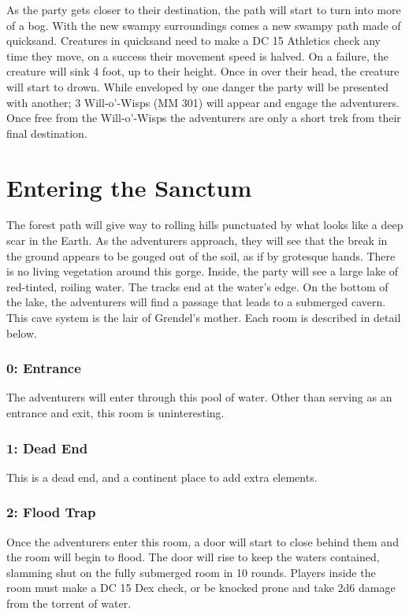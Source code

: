 \documentclass[10pt,twoside,twocolumn,openany]{book}
\begin{document}
As the party gets closer to their destination, the path will start to turn into more of a bog. With the new swampy surroundings comes a new swampy path made of quicksand. Creatures in quicksand need to make a DC 15 Athletics check any time they move, on a success their movement speed is halved. On a failure, the creature will sink 4 foot, up to their height. Once in over their head, the creature will start to drown. While enveloped by one danger the party will be presented with another; 3 Will-o'-Wisps (MM 301) will appear and engage the adventurers. Once free from the Will-o'-Wisps the adventurers are only a short trek from their final destination.

\section{Entering the Sanctum}

The forest path will give way to rolling hills punctuated by what looks like a deep scar in the Earth. As the adventurers approach, they will see that the break in the ground appears to be gouged out of the soil, as if by grotesque hands. There is no living vegetation around this gorge. Inside, the party will see a large lake of red-tinted, roiling water. The tracks end at the water's edge. On the bottom of the lake, the adventurers will find a passage that leads to a submerged cavern. This cave system is the lair of Grendel's mother. Each room is described in detail below.

\subsubsection{0: Entrance}
The adventurers will enter through this pool of water. Other than serving as an entrance and exit, this room is uninteresting.

\subsubsection{1: Dead End}
This is a dead end, and a continent place to add extra elements.

\subsubsection{2: Flood Trap}
Once the adventurers enter this room, a door will start to close behind them and the room will begin to flood. The door will rise to keep the waters contained, slamming shut on the fully submerged room in 10 rounds. Players inside the room must make a DC 15 Dex check, or be knocked prone and take 2d6 damage from the torrent of water.
\end{document}
